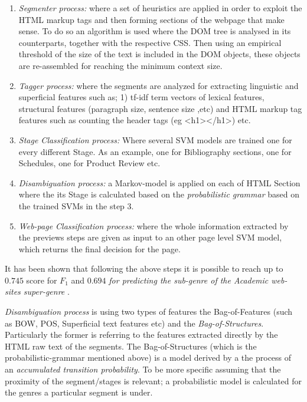 \begin{enumerate}
\item \textit{Segmenter process:} where a set of heuristics are applied in order to exploit the HTML markup tags and then forming sections of the webpage that make sense. To do so an algorithm is used where the DOM tree is analysed in its counterparts, together with the respective CSS. Then using an empirical threshold of the size of the text is included in the DOM objects, these objects are re-assembled for reaching the minimum context size.
\item \textit{Tagger process:} where the segments are analyzed for extracting linguistic and superficial features such as; 1) tf-idf term vectors of lexical features, structural features (paragraph size, sentence size ,etc) and HTML markup tag features such as counting the header tags (eg <h1></h1>) etc.
\item \textit{Stage Classification process:} Where several SVM models are trained one for every different Stage. As an example, one for Bibliography sections, one for Schedules, one for Product Review etc.
\item \textit{Disambiguation process:} a Markov-model is applied on each of  HTML Section where the its Stage is calculated based on the \textit{probabilistic grammar} based on the trained SVMs in the step 3.
\item \textit{Web-page Classification process:} where the whole information extracted by the previews steps are given as input to an other page level SVM model, which returns the final decision for the page. 
\end{enumerate}

It has been shown that following the above steps it is possible to reach up to $0.745$ score for $F_{1}$ and $0.694$  \textit{for predicting the sub-genre of the Academic web-sites super-genre }.

\textit{Disambiguation process} is using two types of features the Bag-of-Features (such as BOW, POS, Superficial text features etc) and the \textit{Bag-of-Structures}. Particularly the former is referring to the features extracted directly by the HTML raw text of the segments. The Bag-of-Structures (which is the probabilistic-grammar mentioned above) is a model derived by a the process of an \textit{accumulated transition probability}. To be more specific assuming that the proximity of the segment/stages is relevant; a probabilistic model is calculated for the genres a particular segment is under.

